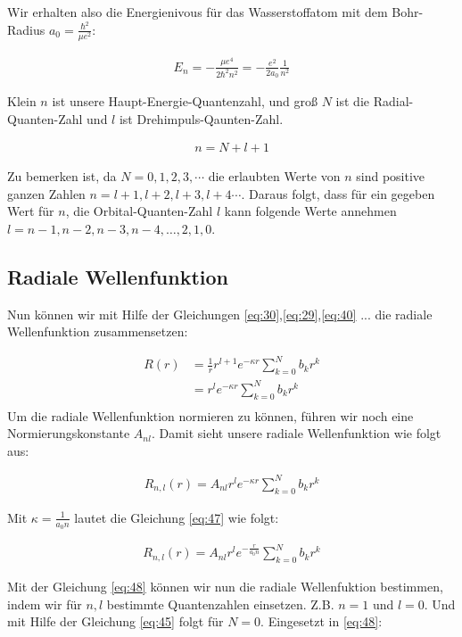 Wir erhalten also die Energienivous für das Wasserstoffatom mit dem Bohr-Radius \(a_0 = \frac{\hbar^2}{\mu e^2}\):

\begin{align}
  \label{eq:46}
  \boxed{E_n =  - \frac{\mu e^4}{2\hbar^2 n^2} = -  \frac{e^2}{2a_0}\frac{1}{n^2} }
\end{align}

Klein \(n\) ist unsere Haupt-Energie-Quantenzahl, und groß \(N\) ist die Radial-Quanten-Zahl und \(l\) ist Drehimpuls-Qaunten-Zahl.

\begin{align}
  \label{eq:45}
  n = N+l+1
\end{align}

Zu bemerken ist, da \(N=0,1,2,3,\cdots\) die erlaubten Werte von \(n\) sind positive ganzen Zahlen \(n=l+1,l+2,l+3,l+4\cdots\). Daraus folgt, dass für ein gegeben Wert für \(n\), die Orbital-Quanten-Zahl \(l\) kann folgende Werte annehmen \(l=n-1,n-2,n-3,n-4,\dots,2,1,0\).


\subsection{Radiale Wellenfunktion}

Nun können wir mit Hilfe der Gleichungen \eqref{eq:30},\eqref{eq:29},\eqref{eq:40} ... die radiale Wellenfunktion zusammensetzen:

\begin{align}
  \label{eq:33}
  R(r) &= \frac{1}{r} r^{l+1}e^{-\kappa r}\sum^{N}_{k=0} b_kr^k \\
&= r^{l}e^{-\kappa r}\sum^{N}_{k=0} b_kr^k \\
\end{align}
Um die radiale Wellenfunktion normieren zu können, führen wir noch eine Normierungskonstante \(A_{nl}\). Damit sieht unsere radiale Wellenfunktion wie folgt aus:

\begin{align}
  \label{eq:47}
   R_{n,l}(r) = A_{nl}r^{l}e^{-\kappa r}\sum^{N}_{k=0} b_kr^k
\end{align}

Mit \(\kappa = \frac{1}{a_0 n}\) lautet die Gleichung \eqref{eq:47} wie folgt:

\begin{align}
  \label{eq:48}
   \boxed{R_{n,l}(r) = A_{nl}r^{l}e^{-\frac{r}{a_0 n}}\sum^{N}_{k=0} b_kr^k}
\end{align}

Mit der Gleichung \eqref{eq:48} können wir nun die radiale Wellenfuktion bestimmen, indem wir für \(n,l\) bestimmte Quantenzahlen einsetzen. Z.B. \(n=1\) und \(l=0\). Und mit Hilfe der Gleichung \eqref{eq:45} folgt für \(N=0\). Eingesetzt in \eqref{eq:48}:

